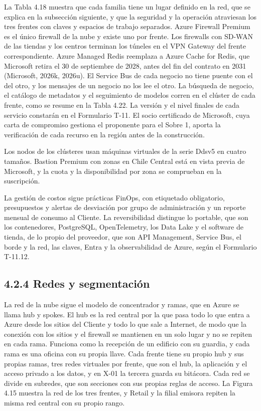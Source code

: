 \documentclass[11pt]{article}
\begin{document}
La Tabla 4.18 muestra que cada familia tiene un lugar definido en la red, que se explica en la subsección siguiente, y que la seguridad y la operación atraviesan los tres frentes con claves y espacios de trabajo separados. Azure Firewall Premium es el único firewall de la nube y existe uno por frente. Los firewalls con SD-WAN de las tiendas y los centros terminan los túneles en el VPN Gateway del frente correspondiente. Azure Managed Redis reemplaza a Azure Cache for Redis, que Microsoft retira el 30 de septiembre de 2028, antes del fin del contrato en 2031 (Microsoft, 2026k, 2026u). El Service Bus de cada negocio no tiene puente con el del otro, y los mensajes de un negocio no los lee el otro. La búsqueda de negocio, el catálogo de metadatos y el seguimiento de modelos corren en el clúster de cada frente, como se resume en la Tabla 4.22. La versión y el nivel finales de cada servicio constarán en el Formulario T-11. El socio certificado de Microsoft, cuya carta de compromiso gestiona el proponente para el Sobre 1, aporta la verificación de cada recurso en la región antes de la construcción. 

Los nodos de los clústeres usan máquinas virtuales de la serie Ddsv5 en cuatro tamaños. Bastion Premium con zonas en Chile Central está en vista previa de Microsoft, y la cuota y la disponibilidad por zona se comprueban en la suscripción.

La gestión de costos sigue prácticas FinOps, con etiquetado obligatorio, presupuestos y alertas de desviación por grupo de administración y un reporte mensual de consumo al Cliente. La reversibilidad distingue lo portable, que son los contenedores, PostgreSQL, OpenTelemetry, los Data Lake y el software de tienda, de lo propio del proveedor, que son API Management, Service Bus, el borde y la red, las claves, Entra y la observabilidad de Azure, según el Formulario T-11.12.

\subsection{4.2.4 Redes y segmentación}

La red de la nube sigue el modelo de concentrador y ramas, que en Azure se llama hub y spokes. El hub es la red central por la que pasa todo lo que entra a Azure desde los sitios del Cliente y todo lo que sale a Internet, de modo que la conexión con los sitios y el firewall se mantienen en un solo lugar y no se repiten en cada rama. Funciona como la recepción de un edificio con su guardia, y cada rama es una oficina con su propia llave. Cada frente tiene su propio hub y sus propias ramas, tres redes virtuales por frente, que son el hub, la aplicación y el acceso privado a los datos, y en X-01 la tercera guarda su bitácora. Cada red se divide en subredes, que son secciones con sus propias reglas de acceso. La Figura 4.15 muestra la red de los tres frentes, y Retail y la filial emisora repiten la misma red central con su propio rango.
\end{document}
